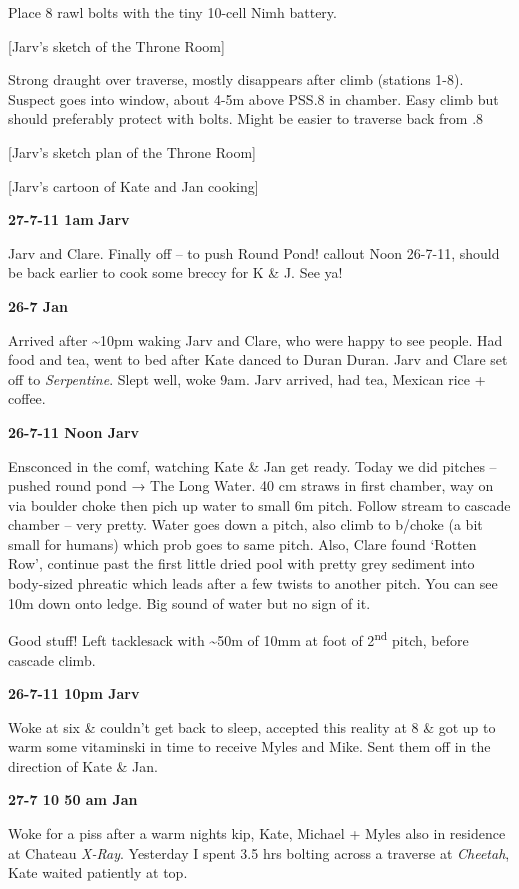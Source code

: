Place 8 rawl bolts with the tiny 10-cell Nimh battery.

{[}Jarv's sketch of the Throne Room{]}

Strong draught over traverse, mostly disappears after climb (stations
1-8). Suspect goes into window, about 4-5m above PSS.8 in chamber. Easy
climb but should preferably protect with bolts. Might be easier to
traverse back from .8

{[}Jarv's sketch plan of the Throne Room{]}

{[}Jarv's cartoon of Kate and Jan cooking{]}

\textbf{27-7-11 1am} \textbf{Jarv}

Jarv and Clare. Finally off -- to push Round Pond! callout Noon 26-7-11,
should be back earlier to cook some breccy for K \& J. See ya!

\textbf{26-7 Jan}

Arrived after \textasciitilde{}10pm waking Jarv and Clare, who were
happy to see people. Had food and tea, went to bed after Kate danced to
Duran Duran. Jarv and Clare set off to \emph{Serpentine}. Slept well,
woke 9am. Jarv arrived, had tea, Mexican rice + coffee.

\textbf{26-7-11 Noon Jarv}

Ensconced in the comf, watching Kate \& Jan get ready. Today we did
pitches -- pushed round pond → The Long Water. 40 cm straws in first
chamber, way on via boulder choke then pich up water to small 6m pitch.
Follow stream to cascade chamber -- very pretty. Water goes down a
pitch, also climb to b/choke (a bit small for humans) which prob goes to
same pitch. Also, Clare found `Rotten Row', continue past the first
little dried pool with pretty grey sediment into body-sized phreatic
which leads after a few twists to another pitch. You can see 10m down
onto ledge. Big sound of water but no sign of it.

Good stuff! Left tacklesack with \textasciitilde{}50m of 10mm at foot of
2\textsuperscript{nd} pitch, before cascade climb.

\textbf{26-7-11 10pm Jarv}

Woke at six \& couldn't get back to sleep, accepted this reality at 8 \&
got up to warm some vitaminski in time to receive Myles and Mike. Sent
them off in the direction of Kate \& Jan.

\textbf{27-7 10 50 am Jan}

Woke for a piss after a warm nights kip, Kate, Michael + Myles also in
residence at Chateau \emph{X-Ray}. Yesterday I spent 3.5 hrs bolting
across a traverse at \emph{Cheetah}, Kate waited patiently at top.

